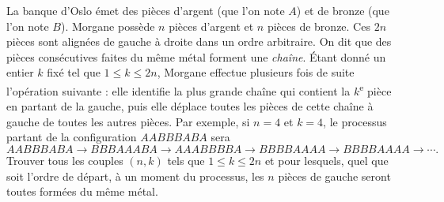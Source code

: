 La banque d'Oslo émet des pièces d'argent (que l'on note $A$) et de bronze (que l'on note $B$). Morgane
possède $n$ pièces d'argent et $n$ pièces de bronze. Ces $2n$ pièces sont alignées de gauche à droite dans un
ordre arbitraire. On dit que des pièces consécutives faites du même métal forment une \emph{chaîne}. Étant
donné un entier $k$ fixé tel que $1 \leqslant k \leqslant 2n$, Morgane effectue plusieurs fois de suite
l'opération suivante : elle identifie la plus grande chaîne qui contient la $k$\textsuperscript{e} pièce en
partant de la gauche, puis elle déplace toutes les pièces de cette chaîne à gauche de toutes les autres pièces.
Par exemple, si $n = 4$ et $k = 4$, le processus partant de la configuration $AABBBABA$ sera
\[
AABBBABA \to BBBAAABA \to AAABBBBA \to BBBBAAAA \to BBBBAAAA \to \cdots.
\]
Trouver tous les couples $(n, k)$ tels que $1 \leqslant k \leqslant 2n$ et pour lesquels, quel que soit
l'ordre de départ, à un moment du processus, les $n$ pièces de gauche seront toutes formées du même métal.
